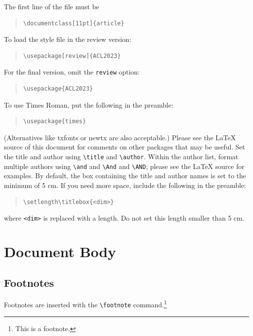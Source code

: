 \documentclass[11pt]{article}
\begin{document}
The first line of the file must be
\begin{quote}
\begin{verbatim}
\documentclass[11pt]{article}
\end{verbatim}
\end{quote}
To load the style file in the review version:
\begin{quote}
\begin{verbatim}
\usepackage[review]{ACL2023}
\end{verbatim}
\end{quote}
For the final version, omit the \verb|review| option:
\begin{quote}
\begin{verbatim}
\usepackage{ACL2023}
\end{verbatim}
\end{quote}
To use Times Roman, put the following in the preamble:
\begin{quote}
\begin{verbatim}
\usepackage{times}
\end{verbatim}
\end{quote}
(Alternatives like txfonts or newtx are also acceptable.)
Please see the \LaTeX{} source of this document for comments on other packages that may be useful.
Set the title and author using \verb|\title| and \verb|\author|. Within the author list, format multiple authors using \verb|\and| and \verb|\And| and \verb|\AND|; please see the \LaTeX{} source for examples.
By default, the box containing the title and author names is set to the minimum of 5 cm. If you need more space, include the following in the preamble:
\begin{quote}
\begin{verbatim}
\setlength\titlebox{<dim>}
\end{verbatim}
\end{quote}
where \verb|<dim>| is replaced with a length. Do not set this length smaller than 5 cm.

\section{Document Body}

\subsection{Footnotes}

Footnotes are inserted with the \verb|\footnote| command.\footnote{This is a footnote.}
\end{document}
